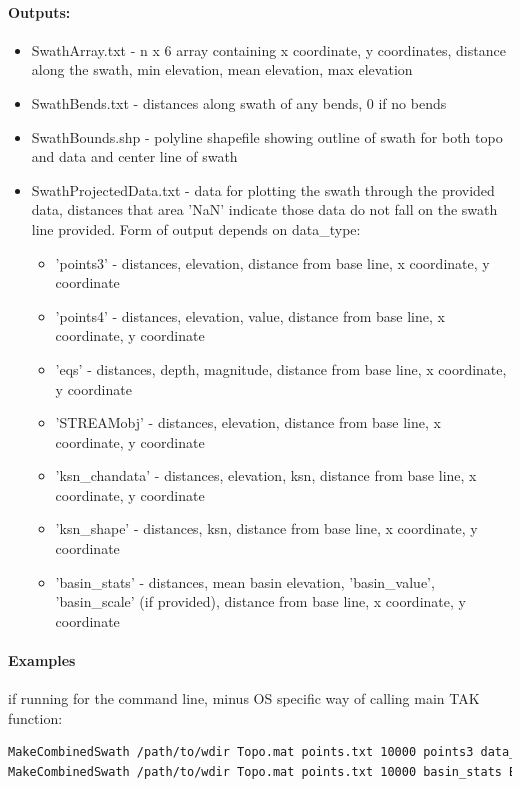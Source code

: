 \paragraph{Outputs:}
\begin{itemize}
\item SwathArray.txt - n x 6 array containing x coordinate, y coordinates, distance along the swath, min elevation, mean elevation, max elevation
\item SwathBends.txt - distances along swath of any bends, 0 if no bends
\item SwathBounds.shp - polyline shapefile showing outline of swath for both topo and data and center line of swath
\item SwathProjectedData.txt - data for plotting the swath through the provided data, distances that area 'NaN' indicate those data do not
fall on the swath line provided. Form of output depends on data\_type:
\begin{itemize}
\item 'points3' - distances, elevation, distance from base line, x coordinate, y coordinate
\item 'points4' - distances, elevation, value, distance from base line, x coordinate, y coordinate
\item 'eqs' - distances, depth, magnitude, distance from base line, x coordinate, y coordinate
\item 'STREAMobj' - distances, elevation, distance from base line, x coordinate, y coordinate
\item 'ksn\_chandata' - distances, elevation, ksn, distance from base line, x coordinate, y coordinate
\item 'ksn\_shape' - distances, ksn, distance from base line, x coordinate, y coordinate
\item 'basin\_stats' - distances, mean basin elevation, 'basin\_value', 'basin\_scale' (if provided), distance from base line, 
x coordinate, y coordinate
\end{itemize}
\end{itemize}

\paragraph{Examples} if running for the command line, minus OS specific way of calling main TAK function:
\begin{lstlisting}[language=bash]
MakeCombinedSwath /path/to/wdir Topo.mat points.txt 10000 points3 data_points.txt 20000
MakeCombinedSwath /path/to/wdir Topo.mat points.txt 10000 basin_stats BasinTable.mat 20000 basin_value mean_ksn
\end{lstlisting}

